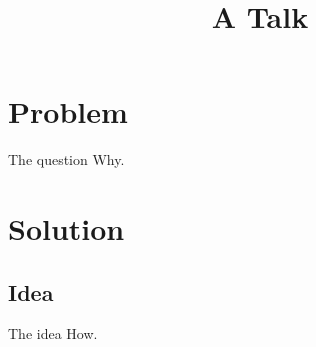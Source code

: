 \documentclass{beamer}
\title{A Talk}
\begin{document}
\frame{\titlepage}
\section{Problem}
\begin{frame}{The question}
Why.
\end{frame}
\section{Solution}
\subsection{Idea}
\begin{frame}{The idea}
How.
\end{frame}
\end{document}
